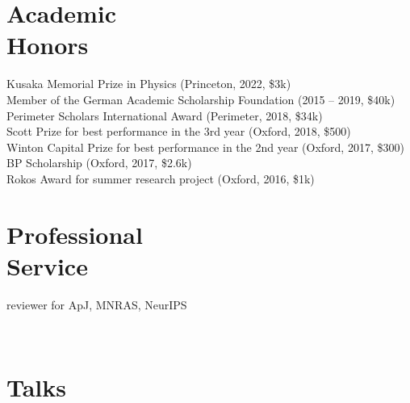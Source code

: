 \documentclass[margin]{res}
\begin{document}
\begin{resume}
\section{Academic \\ Honors}
Kusaka Memorial Prize in Physics (Princeton, 2022, \$3k)\\
Member of the German Academic Scholarship Foundation (2015 -- 2019, \$40k)\\
Perimeter Scholars International Award (Perimeter, 2018, \$34k)\\
Scott Prize for best performance in the 3rd year (Oxford, 2018, \$500)\\
Winton Capital Prize for best performance in the 2nd year (Oxford, 2017, \$300)\\
BP Scholarship (Oxford, 2017, \$2.6k)\\
Rokos Award for summer research project (Oxford, 2016, \$1k)\\

\section{Professional \\ Service}
reviewer for ApJ, MNRAS, NeurIPS

\ \\

\section{Talks}



\end{resume}
\end{document}
